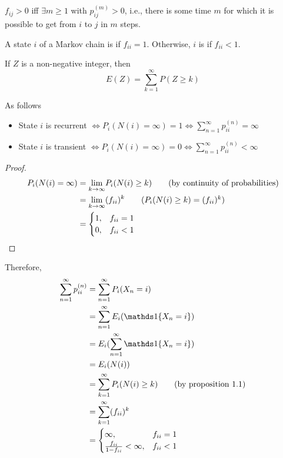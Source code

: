 \documentclass[11pt]{article}
\newcommand{\dur}[3]{{#1}_{#2}^{({#3})}}
\renewcommand{\limit}[1]{\underset{{#1} \rightarrow \infty}{\lim}}
\begin{document}
    \fact
    $f_{ij} > 0$ iff $\exists m \geq 1$ with $\dur{p}{ij}{m} > 0$, i.e., there is some time $m$ for which it is possible to get from $i$ to $j$ in $m$ steps.
    
    A state $i$ of a Markov chain is  if $f_{ii} = 1$. Otherwise, $i$ is  if $f_{ii} < 1$.
    
    \proposition
    If $Z$ is a non-negative integer, then
    $$E(Z) = \sum_{k=1}^\infty P(Z \geq k)$$
    
     As follows
    \begin{itemize}
    	\item  State $i$ is recurrent $\iff P_i(N(i) = \infty) = 1 \iff \sum_{n=1}^\infty p_{ii}^{(n)} = \infty$
    	\item State $i$ is transient $\iff P_i(N(i) = \infty) = 0 \iff \sum_{n=1}^\infty p_{ii}^{(n)} < \infty$ 
    \end{itemize}
    \begin{proof}
    	\begin{align*}
    		P_i(N(i) = \infty) &= \limit{k} P_i(N(i) \geq k) \tag{by continuity of probabilities} \\
    		&= \limit{k} (f_{ii})^k \tag{$P_i(N(i) \geq k) = (f_{ii})^k$}\\
    		&= \begin{cases}
    			1, & f_{ii} = 1 \\
    			0, & f_{ii} < 1
    		\end{cases}
    	\end{align*}
    \end{proof}
    Therefore,
    \begin{align*}
    	\sum_{n=1}^\infty \dur{p}{ii}{n} &= \sum_{n=1}^\infty P_i(X_n = i) \\ 
    	&= \sum_{n=1}^\infty E_i(\id{X_n = i}) \\
    	&= E_i(\sum_{n=1}^\infty \id{X_n = i}) \\
    	&= E_i(N(i)) \\
    	&= \sum_{k=1}^\infty P_i(N(i) \geq k) \tag{by proposition 1.1}\\
    	&= \sum_{k=1}^\infty (f_{ii})^k \\
    	&= \begin{cases}
    		\infty, & f_{ii} = 1\\
    		\frac{f_{ii}}{1 - f_{ii}} < \infty, & f_{ii} < 1
    	\end{cases}
    \end{align*}
    
\end{document}

